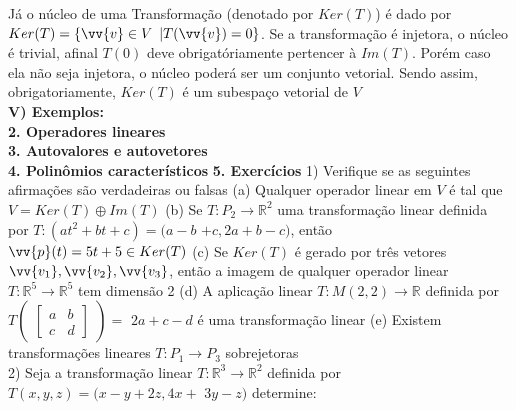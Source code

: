 \documentclass[11pt,a4paper]{article}
\newcommand\tab[1][1.835cm]{\hspace*{#1}}
\newcommand\taba[1][2.55cm]{\hspace*{#1}}
\begin{document}
\begin{flushleft}
\tab Já o núcleo de uma Transformação (denotado por $Ker(T)$) é dado por $Ker(T) = \{ \vv{v} \in V $ $ | T(\vv{v}) = 0\}$. Se a transformação é injetora, o núcleo é trivial, afinal $T(0)$ deve obrigatóriamente pertencer à $Im(T)$. Porém caso ela não seja injetora, o núcleo poderá ser um conjunto vetorial. Sendo assim, obrigatoriamente, $Ker(T)$ é um subespaço vetorial de $V$ \linebreak
\\
\tab \textbf{V) Exemplos:} \linebreak
\taba \linebreak 
\\
\textbf{2. Operadores lineares}\linebreak
\\
\textbf{3. Autovalores e autovetores}\linebreak
\\
\textbf{4. Polinômios característicos}\linebreak
\tab \linebreak 
\textbf{5. Exercícios}\linebreak
\tab 1) Verifique se as seguintes afirmações são verdadeiras ou falsas \linebreak
\taba (a) Qualquer operador linear em $V$ é tal que $V = Ker(T) \oplus Im(T)$ \linebreak
\taba (b) Se $T:P_2\rightarrow\mathbb{R}^2$ uma transformação linear definida por $T:(at^2+bt+c) = (a-b$ $+c,  2a +b-c)$, então $\vv{p}(t)=5t+5 \in Ker(T)$ \linebreak
\taba (c) Se $Ker(T)$ é gerado por três vetores $\vv{v_1}, \vv{v_2}, \vv{v_3}$, então a imagem de qualquer operador linear $T:\mathbb{R}^5\rightarrow\mathbb{R}^5$ tem dimensão 2\linebreak
\taba (d) A aplicação linear $T:M(2,2)\rightarrow\mathbb{R}$ definida por $T\begin{pmatrix}\begin{bmatrix} a & b \\c & d\end{bmatrix}\end{pmatrix} = $ $2a+c-d$ é uma transformação linear\linebreak
\taba (e) Existem transformações lineares $T:P_1 \rightarrow P_3$ sobrejetoras\linebreak
\\
\tab 2) Seja a transformação linear $T:\mathbb{R}^3 \rightarrow \mathbb{R}^2$ definida por $T(x,y,z) = (x-y+2z,4x+ $ $3y-z)$ determine: \linebreak

\end{flushleft}
\end{document}
